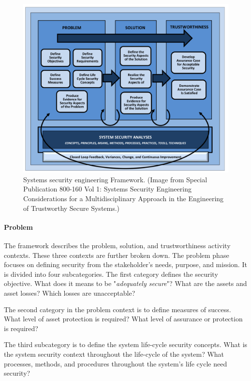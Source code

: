 \documentclass[../../main/main.tex]{subfiles}
\begin{document}
\begin{figure}[h]
\includegraphics[width=\linewidth]{../figures/sseframework}
\caption{\label{sseframework}Systems security engineering Framework. (Image from  Special Publication 800-160 Vol 1: Systems Security Engineering Considerations for a Multidisciplinary Approach in the Engineering of Trustworthy Secure Systems.)}
\end{figure}

\paragraph*{Problem}
The framework describes the problem, solution, and trustworthiness activity contexts.  These three contexts are further broken down.  The problem phase focuses on defining security from the stakeholder's needs, purpose, and mission.  It is divided into four subcategories.  The first category defines the security objective. What does it means to be "\textit{adequately secure}"?   What are the assets and asset losses?  Which losses are unacceptable?
 
The second category in the problem context is to define measures of success.  What level of asset protection is required?  What level of assurance or protection is required?  

The third subcategory is to define the system life-cycle security concepts.  What is the system security context throughout the life-cycle of the system?  What processes, methods, and procedures throughout the system's life cycle need security?  
\end{document}
